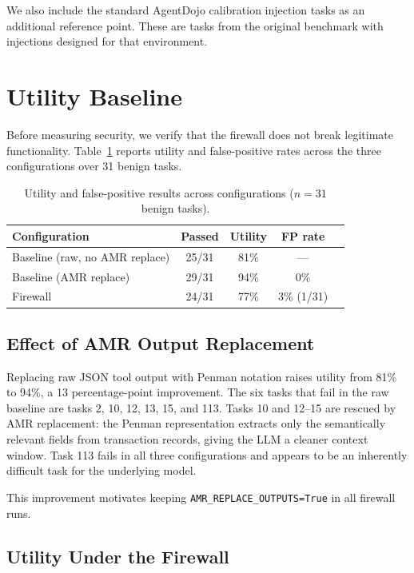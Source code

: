 We also include the standard AgentDojo calibration injection tasks as an additional
reference point.
These are tasks from the original benchmark with injections designed for that environment.

\section{Utility Baseline}
\label{sec:eval-utility}

Before measuring security, we verify that the firewall does not break legitimate
functionality.
Table~\ref{tab:utility} reports utility and false-positive rates across the three
configurations over 31 benign tasks.

\begin{table}[h]
\centering
\caption{Utility and false-positive results across configurations ($n = 31$ benign tasks).}
\label{tab:utility}
\begin{tabular}{lcccc}
\toprule
\textbf{Configuration} & \textbf{Passed} & \textbf{Utility} & \textbf{FP rate} \\
\midrule
Baseline (raw, no AMR replace)  & 25/31 & 81\% & --- \\
Baseline (AMR replace)          & 29/31 & 94\% & 0\% \\
Firewall                        & 24/31 & 77\% & 3\% (1/31) \\
\bottomrule
\end{tabular}
\end{table}

\subsection{Effect of AMR Output Replacement}

Replacing raw JSON tool output with Penman notation raises utility from 81\% to 94\%,
a 13 percentage-point improvement.
The six tasks that fail in the raw baseline are tasks 2, 10, 12, 13, 15, and 113.
Tasks 10 and 12--15 are rescued by AMR replacement: the Penman representation extracts
only the semantically relevant fields from transaction records, giving the LLM a
cleaner context window.
Task 113 fails in all three configurations and appears to be an inherently difficult
task for the underlying model.

This improvement motivates keeping \texttt{AMR\_REPLACE\_OUTPUTS=True} in all
firewall runs.

\subsection{Utility Under the Firewall}

